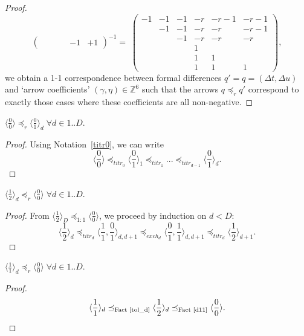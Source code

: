 \documentclass{article}
\begin{document}
\begin{proof}
$$\begin{pmatrix}
       &    &    &    & -1 & +1
  \end{pmatrix}^{-1} =\;
  \begin{pmatrix}
    -1 & -1 & -1 & -r & -r-1 & -r-1 \\
       & -1 & -1 & -r & -r   & -r-1 \\
       &    & -1 & -r & -r   & -r \\
       &    &    &  1 &      &    \\
       &    &    &  1 &  1   &    \\
       &    &    &  1 &  1   &  1
  \end{pmatrix},
  $$
  we obtain a 1-1 correspondence between formal differences $q' = q = (\Delta t,\Delta u)$ and `arrow coefficients' $(\gamma,\eta) \in \mathbb{Z}^6$ such that the arrows $q \preceq_r q'$ correspond to exactly those cases where these coefficients are all non-negative.
\end{proof}

\begin{fact}\label{tol_d}
  $\langle\frac{0}{0}\rangle \preceq_r \langle\frac{0}{1}\rangle_d \;\forall d\in 1..D$.
\end{fact}
\begin{proof}
  Using Notation~\ref{titr0}, we can write
  $$
  \langle\frac{0}{0}\rangle \preceq_{titr_0} \langle\frac{0}{1}\rangle_1 \preceq_{titr_1} ...  \preceq_{titr_{d-1}} \langle\frac{0}{1}\rangle_d.
  $$
\end{proof}

\begin{fact}\label{d11}
  $\langle\frac{1}{2}\rangle_d \preceq_r \langle\frac{0}{0}\rangle \;\forall d\in 1..D$.
\end{fact}
\begin{proof}
  From $\langle\frac{1}{2}\rangle_D \preceq_{1:1} \langle\frac{0}{0}\rangle$, we proceed by induction on $d<D$:
  $$
  \langle\frac{1}{2}\rangle_d \preceq_{titr_d} \langle\frac{1}{1},\frac{0}{1}\rangle_{d,d+1} \preceq_{exch_d} \langle\frac{0}{1},\frac{1}{1}\rangle_{d,d+1} \preceq_{titr_d} \langle\frac{1}{2}\rangle_{d+1}.
  $$
\end{proof}

\begin{fact}\label{tox_d}
  $\langle\frac{1}{1}\rangle_d \preceq_r \langle\frac{0}{0}\rangle \;\forall d\in 1..D$.
\end{fact}
\begin{proof}
  $$
  \langle\frac{1}{1}\rangle_d \preceq_\text{Fact~\ref{tol_d}} \langle\frac{1}{2}\rangle_d \preceq_\text{Fact~\ref{d11}} \langle\frac{0}{0}\rangle.
  $$
\end{proof}
\end{document}
